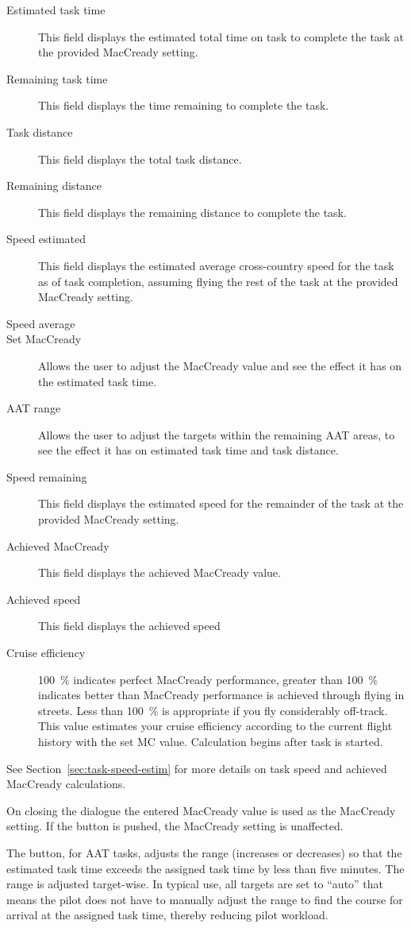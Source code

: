 \begin{description}
\item[Estimated task time]  This field displays the estimated total time
  on task to complete the task at the provided MacCready setting.
\item[Remaining task time]  This field displays the time remaining to complete the task.
\item[Task distance]  This field displays the total task distance.
\item[Remaining distance]  This field displays the remaining distance to complete the task.
\item[Speed estimated]  This field displays the estimated average cross-country
speed for the task as of task completion, assuming flying the rest of the task
at the provided MacCready setting.
\item[Speed average]  %
\item[Set MacCready]  Allows the user to adjust the MacCready value and
  see the effect it has on the estimated task time.
\item[AAT range]  Allows the user to adjust the targets within the remaining
  AAT areas, to see the effect it has on estimated task time and task distance.
\item[Speed remaining]  This field displays the estimated speed for the
  remainder of the task at the provided MacCready setting.
\item[Achieved MacCready]  This field displays the achieved MacCready value.
\item[Achieved speed]  This field displays the achieved speed %
\item[Cruise efficiency]  100~\% indicates perfect MacCready performance, greater
than 100~\% indicates better than MacCready performance is achieved through flying
in streets. Less than 100~\% is appropriate if you fly considerably off-track. This
value estimates your cruise efficiency according to the current flight history
with the set MC value. Calculation begins after task is started.
\end{description}
See Section~\ref{sec:task-speed-estim} for more details on task speed
and achieved MacCready calculations.

On closing the dialogue the entered MacCready value is used as the MacCready
setting. If the  button is pushed, the MacCready setting is
unaffected.

The  button, for AAT tasks, adjusts the range
(increases or decreases) so that the estimated task time exceeds the
assigned task time by less than five minutes.  The range is adjusted
target-wise. In typical use, all targets are set to ``auto'' that means the pilot
does not have to manually adjust the range to find the course for arrival at
the assigned task time, thereby reducing pilot workload.

